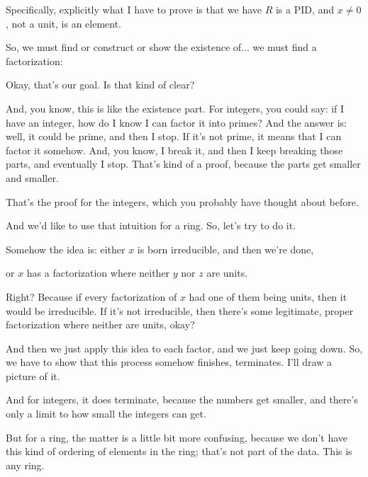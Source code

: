 \begin{proofWrapper}
\begin{speech}[00:59:02 - 01:00:37]
Specifically, explicitly what I have to prove is that we have $R$ is a PID, and $x \neq 0$, not a unit, is an element. 

So, we must find or construct or show the existence of... we must find a factorization: 

Okay, that's our goal. Is that kind of clear?

And, you know, this is like the existence part. For integers, you could say: if I have an integer, how do I know I can factor it into primes? And the answer is: well, it could be prime, and then I stop. If it's not prime, it means that I can factor it somehow. And, you know, I break it, and then I keep breaking those parts, and eventually I stop. That's kind of a proof, because the parts get smaller and smaller.

That's the proof for the integers, which you probably have thought about before.
\end{speech}

\begin{speech}[01:00:37 - 01:02:42]
And we'd like to use that intuition for a ring. So, let's try to do it.

Somehow the idea is: either $x$ is born irreducible, and then we're done, 

or $x$ has a factorization where neither $y$ nor $z$ are units. 

Right? Because if every factorization of $x$ had one of them being units, then it would be irreducible. If it's not irreducible, then there's some legitimate, proper factorization where neither are units, okay?

And then we just apply this idea to each factor, and we just keep going down. So, we have to show that this process somehow finishes, terminates. I'll draw a picture of it.

And for integers, it does terminate, because the numbers get smaller, and there's only a limit to how small the integers can get.

But for a ring, the matter is a little bit more confusing, because we don't have this kind of ordering of elements in the ring; that's not part of the data. This is any ring.


\end{speech}
\end{proofWrapper}
